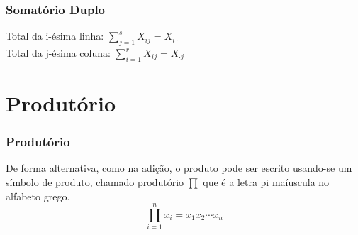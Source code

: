 \documentclass[12pt]{beamer}
\begin{document}
\begin{frame}{}
\frametitle{Somatório Duplo}
\begin{block}{}
\begin{center}
    Total da i-ésima linha: ${\displaystyle \sum_{j=1}^{s}}X_{ij}=X_{i\cdot}$\\
    Total da j-ésima coluna: ${\displaystyle \sum_{i=1}^{r}}X_{ij}=X_{\cdot j}$
\end{center}
\end{block}
\end{frame}

\section{Produtório}
\begin{frame}{}
\frametitle{Produtório}
\begin{block}{}
\justifying
De forma alternativa, como na adição, o produto pode ser escrito usando-se um símbolo de produto, chamado 
produtório $\prod$ que é a letra pi maíuscula no alfabeto grego.
$${\displaystyle \prod_{i=1}^{n}x_{i}=x_{1}x_{2}\cdots x_{n}}$$
\end{block}
\nocite{Morettin09, Apostila, eric, montgomery2016, Bastos2025}
\end{frame}

\begin{frame}[allowframebreaks]
\frametitle{}
\printbibliography
\end{frame}
\end{document}
